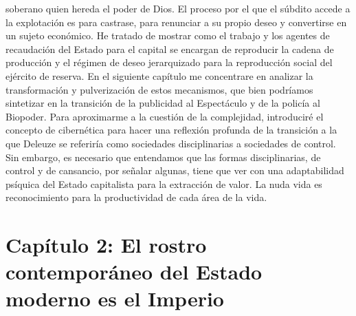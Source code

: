 \documentclass[
]{article}
\begin{document}
soberano quien hereda el poder de Dios. El proceso por el que el súbdito
accede a la explotación es para castrase, para renunciar a su propio
deseo y convertirse en un sujeto económico. He tratado de mostrar como
el trabajo y los agentes de recaudación del Estado para el capital se
encargan de reproducir la cadena de producción y el régimen de deseo
jerarquizado para la reproducción social del ejército de reserva. En el
siguiente capítulo me concentrare en analizar la transformación y
pulverización de estos mecanismos, que bien podríamos sintetizar en la
transición de la publicidad al Espectáculo y de la policía al Biopoder.
Para aproximarme a la cuestión de la complejidad, introduciré el
concepto de cibernética para hacer una reflexión profunda de la
transición a la que Deleuze se referiría como sociedades disciplinarias
a sociedades de control. Sin embargo, es necesario que entendamos que
las formas disciplinarias, de control y de cansancio, por señalar
algunas, tiene que ver con una adaptabilidad psíquica del Estado
capitalista para la extracción de valor. La nuda vida es reconocimiento
para la productividad de cada área de la vida.

\hypertarget{capuxedtulo-2-el-rostro-contemporuxe1neo-del-estado-moderno-es-el-imperio}{%
\section{Capítulo 2: El rostro contemporáneo del Estado moderno es el
Imperio}\label{capuxedtulo-2-el-rostro-contemporuxe1neo-del-estado-moderno-es-el-imperio}}
\end{document}

